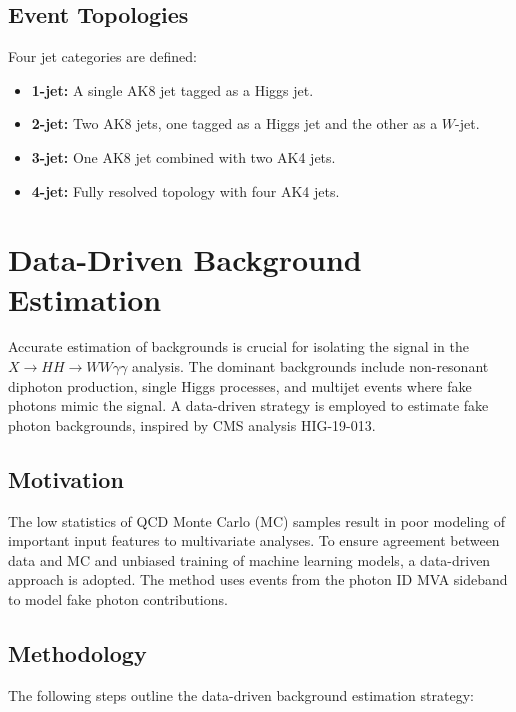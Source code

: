 \subsection*{Event Topologies}
Four jet categories are defined:
\begin{itemize}
    \item \textbf{1-jet:} A single AK8 jet tagged as a Higgs jet.
    \item \textbf{2-jet:} Two AK8 jets, one tagged as a Higgs jet and the other as a \(W\)-jet.
    \item \textbf{3-jet:} One AK8 jet combined with two AK4 jets.
    \item \textbf{4-jet:} Fully resolved topology with four AK4 jets.
\end{itemize}


\section{Data-Driven Background Estimation}
Accurate estimation of backgrounds is crucial for isolating the signal in the \(X \to HH \to WW\gamma\gamma\) analysis.
The dominant backgrounds include non-resonant diphoton production, single Higgs processes, and multijet events
where fake photons mimic the signal.
A data-driven strategy is employed to estimate fake photon backgrounds, inspired by CMS analysis HIG-19-013.

\subsection{Motivation}
The low statistics of QCD Monte Carlo (MC) samples result in poor modeling of important input features to multivariate analyses. To
ensure agreement between data and MC and unbiased training of machine learning models, a data-driven approach is adopted. The method
uses events from the photon ID MVA sideband to model fake photon contributions.

\subsection{Methodology}
The following steps outline the data-driven background estimation strategy:

